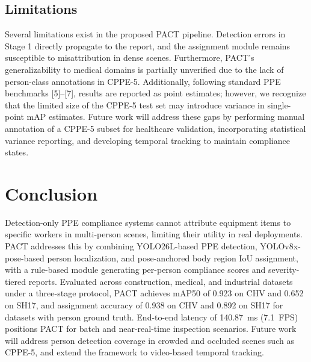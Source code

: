 \documentclass[conference,a4paper]{IEEEtran}
\begin{document}
\subsection{Limitations}
Several limitations exist in the proposed PACT pipeline. Detection errors in Stage 1 directly propagate to the report, and the assignment module remains susceptible to misattribution in dense scenes. Furthermore, PACT’s generalizability to medical domains is partially unverified due to the lack of person-class annotations in CPPE-5. Additionally, following standard PPE benchmarks [5]–[7], results are reported as point estimates; however, we recognize that the limited size of the CPPE-5 test set may introduce variance in single-point mAP estimates. Future work will address these gaps by performing manual annotation of a CPPE-5 subset for healthcare validation, incorporating statistical variance reporting, and developing temporal tracking to maintain compliance states.



\section{Conclusion}
Detection-only PPE compliance systems cannot attribute equipment items to specific workers in multi-person scenes, limiting their utility in real deployments. PACT addresses this by combining YOLO26L-based PPE detection, YOLOv8x-pose-based person localization, and pose-anchored body region IoU assignment, with a rule-based module generating per-person compliance scores and severity-tiered reports. Evaluated across construction, medical, and industrial datasets under a three-stage protocol, PACT achieves mAP50 of 0.923 on CHV and 0.652 on SH17, and assignment accuracy of 0.938 on CHV and 0.892 on SH17 for datasets with person ground truth. End-to-end latency of 140.87~ms (7.1~FPS) positions PACT for batch and near-real-time inspection scenarios. Future work will address person detection coverage in crowded and occluded scenes such as CPPE-5, and extend the framework to video-based temporal tracking.

\small


\end{document}
